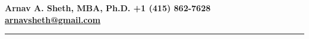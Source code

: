\documentclass[11pt]{article}
\newcommand{\makeheading}[2][]%
        {\hspace*{-\marginparsep minus \marginparwidth}%
         \begin{minipage}[t]{\textwidth+\marginparwidth+\marginparsep}%
             {\large \bfseries #2 \hfill #1}\\[-0.15\baselineskip]%
                 \rule{\columnwidth}{1pt}%
         \end{minipage}}
\renewcommand{\section}[1]{\pagebreak[3]%
    \hyphenpenalty=10000%
    \vspace{1.3\baselineskip}%
    \phantomsection\addcontentsline{toc}{section}{#1}%
    \noindent\llap{\scshape\smash{\parbox[t]{\marginparwidth}{\raggedright #1}}}%
    \vspace{-\baselineskip}\par}
\newenvironment{innerlist}[1][\enskip\textbullet]%
        {\begin{itemize}[#1,leftmargin=*,parsep=0pt,itemsep=0pt,topsep=0pt,partopsep=0pt]}
        {\end{itemize}}
\providecommand*\email[1]{\href{mailto:#1}{#1}}
\begin{document}
\makeheading{Arnav A. Sheth, MBA, Ph.D. \hspace{65pt} +1 (415) 862-7628~ \email{arnavsheth@gmail.com}}

%
%
\newlength{\rcollength}\setlength{\rcollength}{1.65in}%

%


\vspace{-5 pt}
\end{document}
